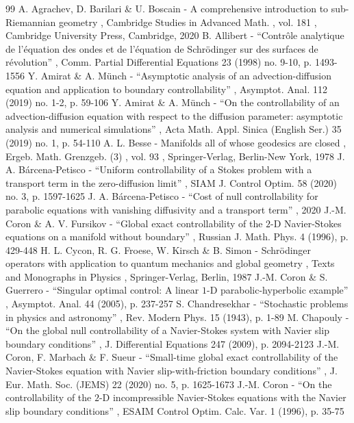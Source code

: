 \documentclass[10pt]{amsart}
\theoremstyle{definition}
\begin{document}
\begin{thebibliography}{99}
 A. Agrachev, D. Barilari \& U. Boscain - A comprehensive introduction to sub-Riemannian geometry , Cambridge Studies in Advanced Math. , vol. 181 , Cambridge University Press, Cambridge, 2020
 B. Allibert - “Contrôle analytique de l’équation des ondes et de l’équation de Schrödinger sur des surfaces de révolution” , Comm. Partial Differential Equations 23 (1998) no. 9-10, p. 1493-1556
 Y. Amirat \& A. Münch - “Asymptotic analysis of an advection-diffusion equation and application to boundary controllability” , Asymptot. Anal. 112 (2019) no. 1-2, p. 59-106
 Y. Amirat \& A. Münch - “On the controllability of an advection-diffusion equation with respect to the diffusion parameter: asymptotic analysis and numerical simulations” , Acta Math. Appl. Sinica (English Ser.) 35 (2019) no. 1, p. 54-110
 A. L. Besse - Manifolds all of whose geodesics are closed , Ergeb. Math. Grenzgeb. (3) , vol. 93 , Springer-Verlag, Berlin-New York, 1978
 J. A. Bárcena-Petisco - “Uniform controllability of a Stokes problem with a transport term in the zero-diffusion limit” , SIAM J. Control Optim. 58 (2020) no. 3, p. 1597-1625
 J. A. Bárcena-Petisco - “Cost of null controllability for parabolic equations with vanishing diffusivity and a transport term” , 2020
 J.-M. Coron \& A. V. Fursikov - “Global exact controllability of the $2$-D Navier-Stokes equations on a manifold without boundary” , Russian J. Math. Phys. 4 (1996), p. 429-448
 H. L. Cycon, R. G. Froese, W. Kirsch \& B. Simon - Schrödinger operators with application to quantum mechanics and global geometry , Texts and Monographs in Physics , Springer-Verlag, Berlin, 1987
 J.-M. Coron \& S. Guerrero - “Singular optimal control: A linear $1$-D parabolic-hyperbolic example” , Asymptot. Anal. 44 (2005), p. 237-257
 S. Chandresekhar - “Stochastic problems in physics and astronomy” , Rev. Modern Phys. 15 (1943), p. 1-89
 M. Chapouly - “On the global null controllability of a Navier-Stokes system with Navier slip boundary conditions” , J. Differential Equations 247 (2009), p. 2094-2123
 J.-M. Coron, F. Marbach \& F. Sueur - “Small-time global exact controllability of the Navier-Stokes equation with Navier slip-with-friction boundary conditions” , J. Eur. Math. Soc. (JEMS) 22 (2020) no. 5, p. 1625-1673
 J.-M. Coron - “On the controllability of the $2$-D incompressible Navier-Stokes equations with the Navier slip boundary conditions” , ESAIM Control Optim. Calc. Var. 1 (1996), p. 35-75

\end{thebibliography}
\end{document}
